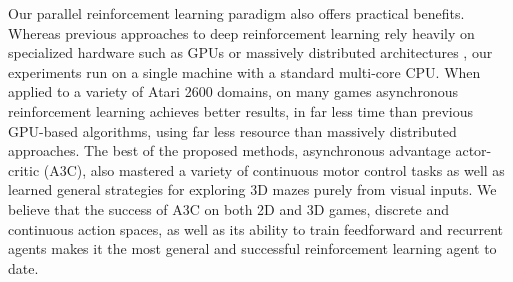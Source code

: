Our parallel reinforcement learning paradigm also offers practical benefits.
%
Whereas previous approaches to deep reinforcement learning rely heavily on specialized hardware such as GPUs \citep{mnih-dqn-2015,hado2015doubledqn,schaul2015prioritized} or massively distributed architectures \citep{nair2015gorila}, our experiments run on a single machine with a standard multi-core CPU.
When applied to a variety of Atari 2600 domains, on many games asynchronous reinforcement learning achieves better results, in far less time than previous GPU-based algorithms, using far less resource than massively distributed approaches.
The best of the proposed methods, asynchronous advantage actor-critic (A3C), also mastered a variety of continuous motor control tasks as well as learned general strategies for exploring 3D mazes purely from visual inputs.
We believe that the success of A3C on both 2D and 3D games, discrete and continuous action spaces, as well as its ability to train feedforward and recurrent agents makes it the most general and successful reinforcement learning agent to date.
